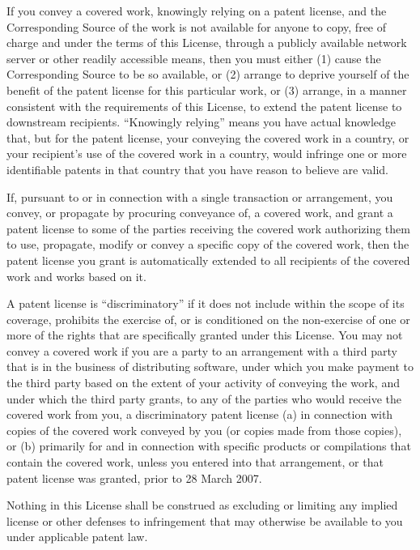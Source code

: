   If you convey a covered work, knowingly relying on a patent license,
and the Corresponding Source of the work is not available for anyone
to copy, free of charge and under the terms of this License, through a
publicly available network server or other readily accessible means,
then you must either (1) cause the Corresponding Source to be so
available, or (2) arrange to deprive yourself of the benefit of the
patent license for this particular work, or (3) arrange, in a manner
consistent with the requirements of this License, to extend the patent
license to downstream recipients.  ``Knowingly relying'' means you have
actual knowledge that, but for the patent license, your conveying the
covered work in a country, or your recipient's use of the covered work
in a country, would infringe one or more identifiable patents in that
country that you have reason to believe are valid.

  If, pursuant to or in connection with a single transaction or
arrangement, you convey, or propagate by procuring conveyance of, a
covered work, and grant a patent license to some of the parties
receiving the covered work authorizing them to use, propagate, modify
or convey a specific copy of the covered work, then the patent license
you grant is automatically extended to all recipients of the covered
work and works based on it.

  A patent license is ``discriminatory'' if it does not include within
the scope of its coverage, prohibits the exercise of, or is
conditioned on the non-exercise of one or more of the rights that are
specifically granted under this License.  You may not convey a covered
work if you are a party to an arrangement with a third party that is
in the business of distributing software, under which you make payment
to the third party based on the extent of your activity of conveying
the work, and under which the third party grants, to any of the
parties who would receive the covered work from you, a discriminatory
patent license (a) in connection with copies of the covered work
conveyed by you (or copies made from those copies), or (b) primarily
for and in connection with specific products or compilations that
contain the covered work, unless you entered into that arrangement,
or that patent license was granted, prior to 28 March 2007.

  Nothing in this License shall be construed as excluding or limiting
any implied license or other defenses to infringement that may
otherwise be available to you under applicable patent law.

